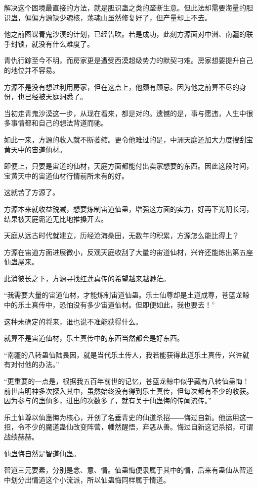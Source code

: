 \begin{this_body}
解决这个困境最直接的方法，就是胆识蛊之类的垄断生意。但此法却需要海量的胆识蛊，偏偏方源缺少魂核，荡魂山虽然修复好了，但产量却上不去。

他之前图谋青鬼沙漠的计划，已经告吹。若是成功，此刻方源面对中洲、南疆的联手封锁，就没有什么难度了。

青仇行踪至今不明，而房家更是遭受西漠超级势力的默契刁难。房家想要提升自己的地位并不容易。

方源不是没有想过利用房家，但在这点上，他颇有顾忌。因为他之前算不尽的身份，也已经被天庭洞悉了。

当初走青鬼沙漠这一步，从现在看来，都是对的。遗憾的是，事与愿违，人生中很多事情都和自己的想法背道而驰。

如此一来，方源的收入就不断萎缩。更令他难过的是，中洲天庭还加大力度搜刮宝黄天中的宙道仙材。

即便上，只要是宙道的仙材，天庭方面都能付出卖家想要的东西。因此这段时间，宝黄天中的宙道仙材行情前所未有的好。

这就苦了方源了。

方源本来就收益锐减，想要炼制宙道仙蛊，增强这方面的实力，好再下光阴长河，结果被天庭霸道无比地推搡开去。

天庭从远古时代就建立，历经沧海桑田，无数年的积累，方源怎么能比得上？

方源在宙道方面进展微小，反观天庭收刮了大量的宙道仙材，兴许还能炼出第五座仙蛊屋来。

此消彼长之下，方源寻找红莲真传的希望越来越渺茫。

“我需要大量的宙道仙材，才能炼制宙道仙蛊。乐土仙尊却是土道成尊，苍蓝龙鲸中的乐土真传中，恐怕没有多少宙道仙材。但即便如此，我也要去！”

这种未确定的将来，谁也说不准能获得什么。

就算不是宙道仙材，乐土真传中的东西当然都会是好东西。

“南疆的八转蛊仙陆畏因，就是当代乐土传人，我若能获得此道乐土真传，兴许就有对付他的办法。”

“更重要的一点是，根据我五百年前世的记忆，苍蓝龙鲸中似乎藏有八转仙蛊悔！前世庙明神多次探入其中，虽然始终没有得到乐土真传，但每次都有不少的收获。因为参与的蛊仙多，进出的次数多了，就有关于仙蛊悔的传闻流传。”

乐土仙尊以仙蛊悔为核心，开创了名垂青史的仙道杀招――悔过自新。他运用这一招，令不少的魔道蛊仙改变阵营，幡然醒悟，弃恶从善。悔过自新这记杀招，可谓战绩赫赫。

仙蛊悔自然是智道仙蛊。

智道三元要素，分别是念、意、情。仙蛊悔便隶属于其中的情，后来有蛊仙从智道中划分出情道这个小流派，所以仙蛊悔同样属于情道。


\end{this_body}
